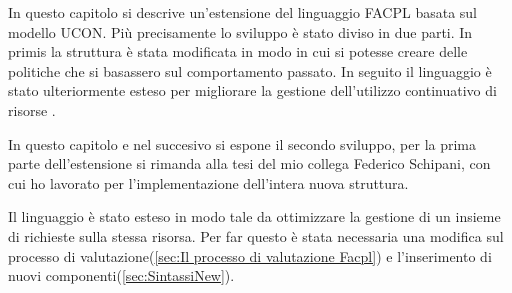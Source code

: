 \label{chap:Usage Control in FACPL}
In questo capitolo si descrive un'estensione del linguaggio \ac{FACPL} basata sul modello \ac{UCON}.
Più precisamente lo sviluppo è stato diviso in due parti. In primis la struttura è stata modificata in modo
in cui si potesse creare delle politiche che si basassero sul comportamento passato. In seguito il linguaggio
è stato ulteriormente esteso per migliorare la gestione dell'utilizzo continuativo di risorse .\par
In questo capitolo e nel succesivo si espone il secondo sviluppo, per la prima parte dell'estensione si rimanda
alla tesi del mio collega Federico Schipani, con cui ho lavorato per l'implementazione dell'intera nuova struttura. \par
Il linguaggio è stato esteso in modo tale da ottimizzare la gestione di un insieme di richieste sulla stessa risorsa.
Per far questo è stata necessaria una modifica sul processo di valutazione(\ref{sec:Il processo di valutazione Facpl})
e l'inserimento di nuovi componenti(\ref{sec:SintassiNew}).
